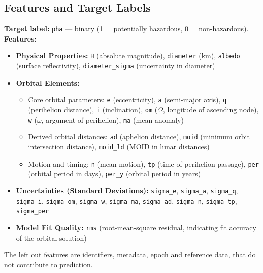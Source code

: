 \documentclass{article}
\begin{document}
\medskip

\subsection*{Features and Target Labels}
\medskip
\textbf{Target label:} \texttt{pha} — binary (1 = potentially hazardous, 0 = non-hazardous). \\
\textbf{Features:} 
\begin{itemize}
    \item \textbf{Physical Properties:} \texttt{H} (absolute magnitude), \texttt{diameter} (km), \texttt{albedo} (surface reflectivity), \texttt{diameter\_sigma} (uncertainty in diameter)

    \item \textbf{Orbital Elements:}
    \begin{itemize}
        \item Core orbital parameters: \texttt{e} (eccentricity), \texttt{a} (semi-major axis), \texttt{q} (perihelion distance), \texttt{i} (inclination), \texttt{om} ($\Omega$, longitude of ascending node), \texttt{w} ($\omega$, argument of perihelion), \texttt{ma} (mean anomaly)
        \item Derived orbital distances: \texttt{ad} (aphelion distance), \texttt{moid} (minimum orbit intersection distance), \texttt{moid\_ld} (MOID in lunar distances)
        \item Motion and timing: \texttt{n} (mean motion), \texttt{tp} (time of perihelion passage), \texttt{per} (orbital period in days), \texttt{per\_y} (orbital period in years)
    \end{itemize}

    \item \textbf{Uncertainties (Standard Deviations):} \texttt{sigma\_e}, \texttt{sigma\_a}, \texttt{sigma\_q}, \texttt{sigma\_i}, \texttt{sigma\_om}, \texttt{sigma\_w}, \texttt{sigma\_ma}, \texttt{sigma\_ad}, \texttt{sigma\_n}, \texttt{sigma\_tp}, \texttt{sigma\_per}

    \item \textbf{Model Fit Quality:} \texttt{rms} (root-mean-square residual, indicating fit accuracy of the orbital solution)

\end{itemize}

The left out features are identifiers, metadata, epoch and reference data, that do not contribute to prediction.
\medskip
\end{document}
